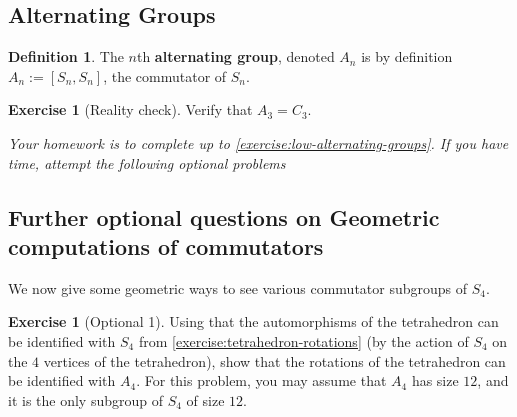 \documentclass[reqno, 12pt, letter]{article}
\theoremstyle{plain}
\theoremstyle{definition}
\newtheorem{definition}[theorem]{Definition}
\newtheorem{exercise}[theorem]{Exercise}
\theoremstyle{remark}
\numberwithin{equation}{section}
\begin{document}

\subsection{Alternating Groups}

\begin{definition}
	\label{definition:alternating}
	The $n$th {\bf alternating group}, denoted $A_n$ is by definition $A_n := \left[ S_n, S_n \right]$, the commutator of $S_n$.
\end{definition}
\begin{exercise}[Reality check]
	\label{exercise:low-alternating-groups}
	Verify that $A_3 = C_3$.
\end{exercise}

{\it Your homework is to complete up to \autoref{exercise:low-alternating-groups}. If you have time, attempt the following optional
problems}

\subsection{Further optional questions on Geometric computations of commutators}
We now give some geometric ways to see various commutator subgroups of $S_4$.
\begin{exercise}[Optional 1]
	\label{exercise:}
	Using that the automorphisms of the tetrahedron can be identified with $S_4$ from \autoref{exercise:tetrahedron-rotations} (by the action of
	$S_4$ on the $4$ vertices of the tetrahedron),
	show that the rotations of the tetrahedron can be identified with $A_4$. For this problem, you may assume that $A_4$ has size $12$, and
	it is the only subgroup of $S_4$ of size $12$.
\end{exercise}
\end{document}
